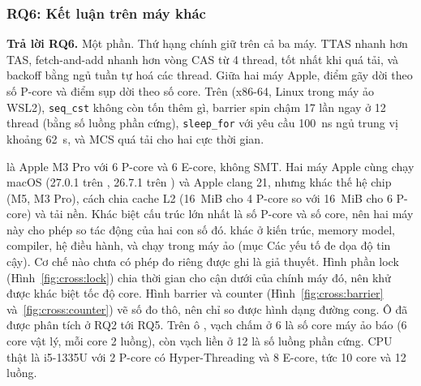 \subsubsection{RQ6: Kết luận trên máy khác}

\begin{rqanswer}\textbf{Trả lời RQ6.} Một phần. Thứ hạng chính giữ trên cả ba máy. TTAS nhanh hơn TAS,
fetch-and-add nhanh hơn vòng CAS từ 4 thread,  tốt nhất khi quá tải, và backoff bằng
ngủ tuần tự hoá các thread. Giữa hai máy Apple, điểm gãy dời theo số P-core và điểm sụp dời theo số core.
Trên  (x86-64, Linux trong máy ảo WSL2), \texttt{seq\_cst} không còn tốn thêm gì, barrier
spin chậm 17 lần ngay ở 12 thread (bằng số luồng phần cứng), \texttt{sleep\_for} với yêu cầu 100~ns ngủ trung
vị khoảng 62~\textmu s, và MCS quá tải cho hai cực thời gian.\end{rqanswer}

 là Apple M3 Pro với 6 P-core và 6 E-core, không SMT. Hai máy Apple cùng chạy macOS
(27.0.1 trên , 26.7.1 trên ) và Apple clang 21, nhưng khác thế hệ chip
(M5, M3 Pro), cách chia cache L2 (16~MiB cho 4 P-core so với 16~MiB cho 6 P-core) và tải nền. Khác biệt
cấu trúc lớn nhất là số P-core và số core, nên hai máy này cho phép so tác động của hai con số đó.
 khác  ở kiến trúc, memory model, compiler, hệ điều hành, và chạy trong máy ảo (mục Các yếu tố
đe dọa độ tin cậy). Cơ chế nào chưa có phép đo riêng được ghi là giả thuyết. Hình phần lock
(Hình~\ref{fig:cross:lock}) chia thời gian cho cận dưới của chính máy đó, nên khử được khác biệt tốc độ
core. Hình barrier và counter (Hình~\ref{fig:cross:barrier} và~\ref{fig:cross:counter}) vẽ số đo thô, nên
chỉ so được hình dạng đường cong. Ô  đã được phân tích ở RQ2 tới RQ5. Trên ô
, vạch chấm ở 6 là số core máy ảo báo (6 core vật lý, mỗi core 2 luồng), còn vạch liền ở
12 là số luồng phần cứng. CPU thật là i5-1335U với 2 P-core có Hyper-Threading và 8 E-core, tức 10 core
và 12 luồng.

